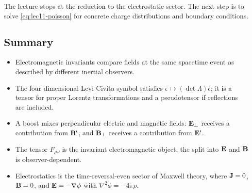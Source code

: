 \begin{center}
\end{center}

The lecture stops at the reduction to the electrostatic sector.  The next step is
to solve \eqref{eq:lec11-poisson} for concrete charge distributions and boundary
conditions.

\subsection{Summary}\label{subsec:lec11-summary}

\begin{itemize}
  \item Electromagnetic invariants compare fields at the same spacetime event as
        described by different inertial observers.
  \item The four-dimensional Levi-Civita symbol satisfies
        $\epsilon\mapsto(\det\Lambda)\epsilon$; it is a tensor for proper Lorentz
        transformations and a pseudotensor if reflections are included.
  \item A boost mixes perpendicular electric and magnetic fields:
        $\mathbf{E}_\perp$ receives a contribution from $\mathbf{B}'$, and $\mathbf{B}_\perp$ receives
        a contribution from $\mathbf{E}'$.
  \item The tensor $F_{\mu\nu}$ is the invariant electromagnetic object; the split
        into $\mathbf{E}$ and $\mathbf{B}$ is observer-dependent.
  \item Electrostatics is the time-reversal-even sector of Maxwell theory, where
        $\mathbf{J}=0$, $\mathbf{B}=0$, and $\mathbf{E}=-\nabla\phi$ with
        $\nabla^2\phi=-4\pi\rho$.
\end{itemize}
